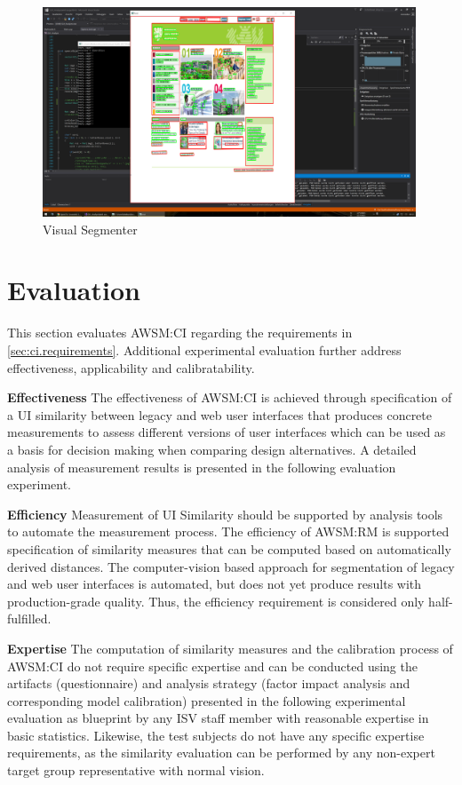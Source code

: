 \begin{figure}
\hypertarget{fig:ui-recognition}{%
\centering
\includegraphics[width=0.99\textwidth]{../figures/screenshots/UI-Element-Recognition.png}
\caption{Visual Segmenter}\label{fig:ui-recognition}
}
\end{figure}

\hypertarget{evaluation}{%
\section{Evaluation}\label{evaluation}}

This section evaluates AWSM:CI regarding the requirements in \cref{sec:ci.requirements}.
Additional experimental evaluation further address effectiveness, applicability and calibratability.

\textbf{Effectiveness} The effectiveness of AWSM:CI is achieved through specification of a UI similarity between legacy and web user interfaces that produces concrete measurements to assess different versions of user interfaces which can be used as a basis for decision making when comparing design alternatives.
A detailed analysis of measurement results is presented in the following evaluation experiment.

\textbf{Efficiency} Measurement of UI Similarity should be supported by analysis tools to automate the measurement process.
The efficiency of AWSM:RM is supported specification of similarity measures that can be computed based on automatically derived distances.
The computer-vision based approach for segmentation of legacy and web user interfaces is automated, but does not yet produce results with production-grade quality.
Thus, the efficiency requirement is considered only half-fulfilled.

\textbf{Expertise} The computation of similarity measures and the calibration process of AWSM:CI do not require specific expertise and can be conducted using the artifacts (questionnaire) and analysis strategy (factor impact analysis and corresponding model calibration) presented in the following experimental evaluation as blueprint by any ISV staff member with reasonable expertise in basic statistics.
Likewise, the test subjects do not have any specific expertise requirements, as the similarity evaluation can be performed by any non-expert target group representative with normal vision.


